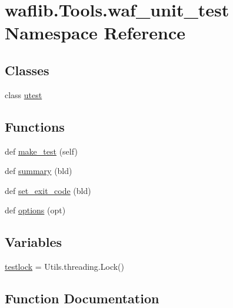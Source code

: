 \hypertarget{namespacewaflib_1_1_tools_1_1waf__unit__test}{}\section{waflib.\+Tools.\+waf\+\_\+unit\+\_\+test Namespace Reference}
\label{namespacewaflib_1_1_tools_1_1waf__unit__test}
\subsection*{Classes}
\begin{DoxyCompactItemize}
\item 
class \hyperlink{classwaflib_1_1_tools_1_1waf__unit__test_1_1utest}{utest}
\end{DoxyCompactItemize}
\subsection*{Functions}
\begin{DoxyCompactItemize}
\item 
def \hyperlink{namespacewaflib_1_1_tools_1_1waf__unit__test_a480792e43cdb6d6a2bd79b2ec412cf00}{make\+\_\+test} (self)
\item 
def \hyperlink{namespacewaflib_1_1_tools_1_1waf__unit__test_ad245dac5d636a5c5f49cb0e232d332f4}{summary} (bld)
\item 
def \hyperlink{namespacewaflib_1_1_tools_1_1waf__unit__test_a0f1dc47e6fcefddfd017ce557eb4da42}{set\+\_\+exit\+\_\+code} (bld)
\item 
def \hyperlink{namespacewaflib_1_1_tools_1_1waf__unit__test_a8f30080b41250ee5ad33b2ad2df40f0c}{options} (opt)
\end{DoxyCompactItemize}
\subsection*{Variables}
\begin{DoxyCompactItemize}
\item 
\hyperlink{namespacewaflib_1_1_tools_1_1waf__unit__test_af3beb7b88e00dcd00d4435a61a0c0e71}{testlock} = Utils.\+threading.\+Lock()
\end{DoxyCompactItemize}


\subsection{Function Documentation}
